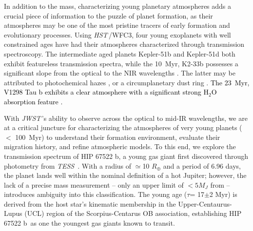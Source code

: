 \documentclass[twocolumn]{aastex63} %
\newcommand{\water}{H$_2$O}
\newcommand{\tess}{\textit{TESS}}
\newcommand{\jwst}{\textit{JWST}}
\newcommand{\hst}{\textit{HST}}
\newcommand{\plname}{HIP 67522 b}
\newcommand{\newedit}[1]{\textcolor{black}{#1}}
\begin{document}
In addition to the mass, characterizing young planetary atmospheres adds a crucial piece of information to the puzzle of planet formation, as their atmospheres may be one of the most pristine tracers of early formation and evolutionary processes. Using \hst\,/WFC3, four young exoplanets with well constrained ages have had their atmospheres characterized through transmission spectroscopy. The intermediate aged planets Kepler-51b and Kepler-51d \citep[500-700~Myr;][]{Libby-Roberts2022} both exhibit featureless transmission spectra, while the 10~Myr, K2-33b possesses a significant slope from the optical to the NIR wavelengths \citep{Thao2023}. The latter may be attributed to photochemical hazes \citep{Gao_hazes, Wang2019, Ohno2021}, or a circumplanetary dust ring \citep{ohno2022circumplanetary}. \newedit{The 23~Myr, V1298 Tau b exhibits a clear atmosphere with a significant strong \water\, absorption feature \citep{Barat2024_V1298Taub}.}

With \jwst\,'s ability to observe across the optical to mid-IR wavelengths, we are at a critical juncture for characterizing the atmospheres of very young planets ($<$ 100\, Myr) to understand their formation environment, evaluate their migration history, and refine atmospheric models. To this end, we explore the transmission spectrum of \plname, a young gas giant first discovered through photometry from \tess\ \citep{Rizzuto2020}. With a radius of $\simeq$10 $R_{\oplus}$ and a period of 6.96 days, the planet lands well within the nominal definition of a hot Jupiter; however, the lack of a precise mass measurement -- only an upper limit of $<5M_{J}$ from \cite{Rizzuto2020} -- introduces ambiguity into this classification. The young age ($\tau$= 17$\pm$2 Myr) is derived from the host star's kinematic membership in the Upper-Centaurus-Lupus (UCL) region of the Scorpius-Centarus OB association, establishing \plname\ as one the youngest gas giants known to transit.
\end{document}
